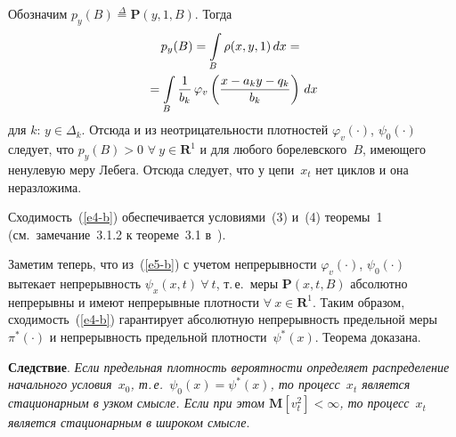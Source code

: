 \begin{multicols}{2}
\begin{figure*}[b] %
\vspace*{1pt}
\begin{minipage}[t]{80mm}
\begin{center}
\mbox{%
\epsfxsize=78.407mm
}
\end{center}
\vspace*{-9pt}
\end{minipage}
\hfill
\vspace*{1pt}
\begin{minipage}[t]{80mm}
\begin{center}
\mbox{%
\epsfxsize=78.848mm
}
\end{center}
\vspace*{-9pt}
\end{minipage}
\end{figure*}
  
  Обозначим $p_y(B)\overset{\Delta}{=} \mathbf{P}(y,1,B)$. Тогда
  \begin{multline*}
  p_y(B) =\int\limits_B \rho(x,y,1)\,dx={}\\
  {}=\int\limits_B \displaystyle\frac{\displaystyle 1\mathstrut}{\displaystyle b_k\mathstrut}\,\varphi_v \left( \displaystyle\frac{\displaystyle x-a_ky-
q_k\mathstrut}{\displaystyle b_k\mathstrut}\right)\,dx
  \end{multline*} 
  для ${k:}\, y\in \Delta_k$. Отсюда и из неотри\-ца\-тель\-ности плотностей $\varphi_v(\cdot)$, 
$\psi_0(\cdot)$ следует, что $p_y(B)>0$ $\forall\ y\in \mathbf{R}^1$ и для любого 
борелевского~$B$, име\-юще\-го ненулевую меру Лебега. Отсюда следует, что у цепи~$x_t$ нет 
циклов и она неразложима.
  
  Сходимость~(\ref{e4-b}) обеспечивается условиями~(3) и~(4) теоремы~1 (см.\ замечание~3.1.2 к 
теореме~3.1 в~\cite{18-b}).
  
  Заметим теперь, что из~(\ref{e5-b}) с учетом не\-пре\-рыв\-ности $\varphi_v(\cdot)$, 
$\psi_0(\cdot)$ вытекает непрерывность $\psi_x(x,t)\ \forall\ t$, т.\,е.\ меры $\mathbf{P}(x,t,B)$ 
абсолютно непрерывны и имеют непрерывные плотности $\forall\ x\in \mathbf{R}^1$. Таким 
образом, сходимость~(\ref{e4-b}) гарантирует абсолютную непрерывность предельной меры 
$\pi^*(\cdot)$ и непрерывность предельной плотности~$\psi^*(x)$. Тео\-ре\-ма 
до\-ка\-зана.

  \smallskip
  
  \noindent
  \textbf{Следствие}. \textit{Если предельная плотность вероятности определяет 
распределение начального условия~$x_0$, т.\,е.\ $\psi_0(x)=\psi^*(x)$, то процесс~$x_t$ 
является стационарным в узком смысле. Если при этом $\mathbf{M}[v_t^2]<\infty$, то 
процесс~$x_t$ является стационарным в широком смысле}.
  

\end{multicols}
